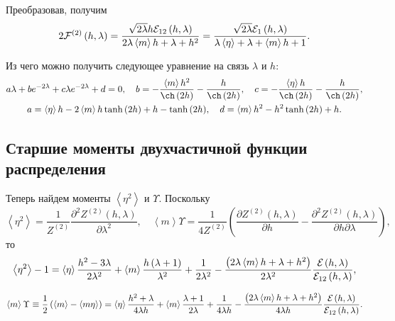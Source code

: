 \documentclass[12pt]{article}
\def\sr#1{\left<#1\right>}
\def\ZV{Z^{(2)}}
\begin{document}
Преобразовав, получим 
\begin{equation}
    2{\cal F}^{(2)}\left(h,\lambda\right) = \frac{\sqrt{2\lambda} h {\cal E}_{12}\left(h, \lambda\right)}{2 \lambda \left<m\right> h + \lambda + h^{2}} = \frac{\sqrt{2\lambda} {\cal E}_{1}\left(h, \lambda\right)}{\lambda \left<\eta\right> + \lambda + \left<m\right> h + 1}.
\end{equation}

Из чего можно получить следующее уравнение на связь $\lambda$ и $h$:
\begin{equation}
    \begin{gathered}
        a\lambda+be^{-2\lambda}+c\lambda e^{-2\lambda} + d = 0, \quad b=- \frac{\left<m\right> h^{2}}{\ch\left(2 h\right)} - \frac{h}{\ch\left(2 h\right)}, \quad c = - \frac{\left<\eta\right> h}{\ch\left(2 h\right)} - \frac{h}{\ch\left(2 h\right)}
        ,
        \\ 
        a = \left<\eta\right> h - 2 \left<m\right> h \tanh{\left(2 h \right)} + h - \tanh{\left(2 h \right)}, 
        \quad
        d = \left<m\right> h^{2} - h^{2} \tanh{\left(2 h \right)} + h.
    \end{gathered}
\end{equation}

\subsection*{Старшие моменты двухчастичной функции распределения}
Теперь найдем моменты $\sr{\eta^2}$ и $\Upsilon$. Поскольку
\begin{equation}
    \sr{\eta^2} = \frac{1}{\ZV} \frac{\partial^2 \ZV(h, \lambda)}{\partial \lambda^2}, \quad \sr m \Upsilon = \frac{1}{4\ZV}\left(\frac{\partial \ZV(h, \lambda)}{\partial h} - \frac{\partial^2 \ZV(h, \lambda)}{\partial h \partial\lambda}\right),
\end{equation}
то
\begin{equation}
    \sr{\eta^2} - 1 = \sr\eta\frac{h^{2} - 3 \lambda}{2 \lambda^{2}} + \left<m\right>\frac{h \left(\lambda + 1\right)}{\lambda^{2}} + \frac{1}{2 \lambda^{2}} - \frac{\left(2 \lambda \left<m\right> h + \lambda + h^{2}\right)}{2 \lambda^{2}}\frac{{\cal E}_{}\left(h, \lambda\right)}{{\cal E}_{12}\left(h, \lambda\right)},
\end{equation}

\begin{equation}
    \sr m \Upsilon \equiv \frac{1}{2}\left(\sr m - \sr{m\eta}\right) = \left<\eta\right> \frac{h^{2} + \lambda}{4 \lambda h} + \left<m\right>\frac{\lambda + 1}{2 \lambda} + \frac{1}{4 \lambda h} - \frac{\left(2 \lambda \left<m\right> h + \lambda + h^{2}\right)}{4 \lambda h}\frac{{\cal E}_{}\left(h, \lambda\right)}{{\cal E}_{12}\left(h, \lambda\right)}.
\end{equation}
\end{document}
